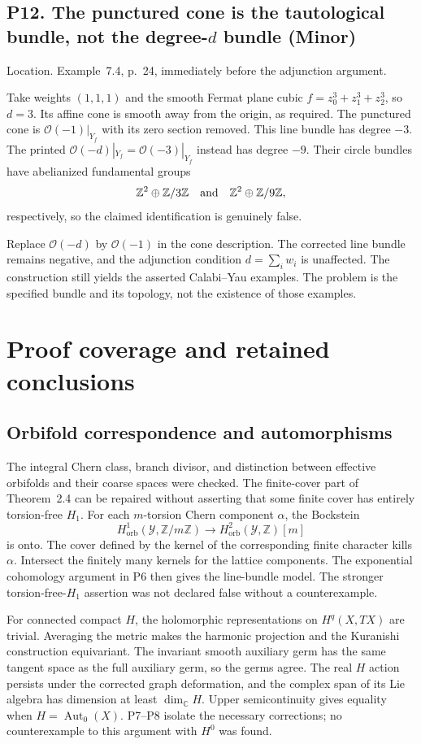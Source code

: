 \documentclass[10pt]{article}
\begin{document}
\subsection*{P12. The punctured cone is the tautological bundle, not the degree-\(d\) bundle (Minor)}
Location. Example 7.4, p. 24, immediately before the adjunction argument.\par
Take weights \((1,1,1)\) and the smooth Fermat plane cubic \(f=z_0^3+z_1^3+z_2^3\), so \(d=3\). Its affine cone is smooth away from the origin, as required. The punctured cone is \(\mathcal O(-1)|_{Y_f}\) with its zero section removed. This line bundle has degree \(-3\). The printed \(\mathcal O(-d)|_{Y_f}=\mathcal O(-3)|_{Y_f}\) instead has degree \(-9\). Their circle bundles have abelianized fundamental groups \[\mathbb Z^2\oplus\mathbb Z/3\mathbb Z
       \quad\hbox{and}\quad
 \mathbb Z^2\oplus\mathbb Z/9\mathbb Z,\] respectively, so the claimed identification is genuinely false.\par
Replace \(\mathcal O(-d)\) by \(\mathcal O(-1)\) in the cone description. The corrected line bundle remains negative, and the adjunction condition \(d=\sum_iw_i\) is unaffected. The construction still yields the asserted Calabi–Yau examples. The problem is the specified bundle and its topology, not the existence of those examples.\par
\section*{Proof coverage and retained conclusions}
\subsection*{Orbifold correspondence and automorphisms}
The integral Chern class, branch divisor, and distinction between effective orbifolds and their coarse spaces were checked. The finite-cover part of Theorem 2.4 can be repaired without asserting that some finite cover has entirely torsion-free \(H_1\). For each \(m\)-torsion Chern component \(\alpha\), the Bockstein \[H^1_{\mathrm{orb}}(\mathcal Y,\mathbb Z/m\mathbb Z)\longrightarrow
                       H^2_{\mathrm{orb}}(\mathcal Y,\mathbb Z)[m]\] is onto. The cover defined by the kernel of the corresponding finite character kills \(\alpha\). Intersect the finitely many kernels for the lattice components. The exponential cohomology argument in P6 then gives the line-bundle model. The stronger torsion-free-\(H_1\) assertion was not declared false without a counterexample.\par
For connected compact \(H\), the holomorphic representations on \(H^q(X,TX)\) are trivial. Averaging the metric makes the harmonic projection and the Kuranishi construction equivariant. The invariant smooth auxiliary germ has the same tangent space as the full auxiliary germ, so the germs agree. The real \(H\) action persists under the corrected graph deformation, and the complex span of its Lie algebra has dimension at least \(\dim_\mathbb CH\). Upper semicontinuity gives equality when \(H=\operatorname{Aut}_0(X)\). P7–P8 isolate the necessary corrections; no counterexample to this argument with \(H^0\) was found.\par
\end{document}
